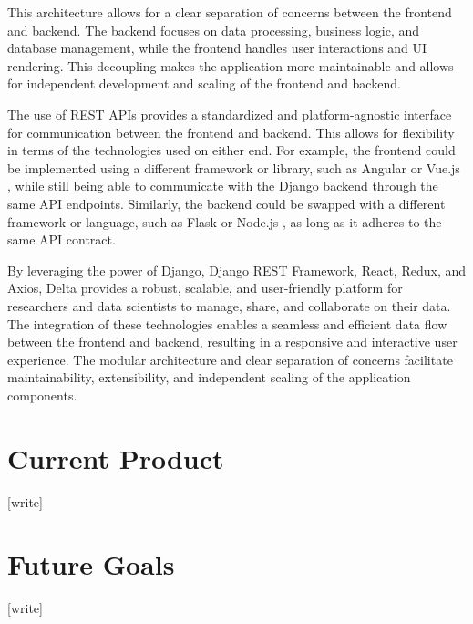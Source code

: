 \documentclass[conference]{IEEEtran}
\begin{document}
This architecture allows for a clear separation of concerns between the frontend and backend. The backend focuses on data processing, business logic, and database management, while the frontend handles user interactions and UI rendering. This decoupling makes the application more maintainable and allows for independent development and scaling of the frontend and backend.

The use of REST APIs provides a standardized and platform-agnostic interface for communication between the frontend and backend. This allows for flexibility in terms of the technologies used on either end. For example, the frontend could be implemented using a different framework or library, such as Angular \cite{angular} or Vue.js \cite{vue}, while still being able to communicate with the Django backend through the same API endpoints. Similarly, the backend could be swapped with a different framework or language, such as Flask \cite{flask} or Node.js \cite{nodejs}, as long as it adheres to the same API contract.

By leveraging the power of Django, Django REST Framework, React, Redux, and Axios, Delta provides a robust, scalable, and user-friendly platform for researchers and data scientists to manage, share, and collaborate on their data. The integration of these technologies enables a seamless and efficient data flow between the frontend and backend, resulting in a responsive and interactive user experience. The modular architecture and clear separation of concerns facilitate maintainability, extensibility, and independent scaling of the application components.
\section{Current Product}
[write]
\section{Future Goals}
[write]
\end{document}
